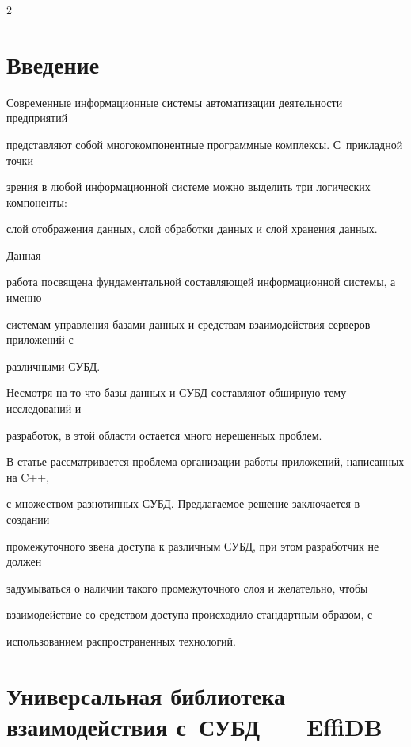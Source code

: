       \begin{multicols}{2}

      

            \label{st\stat}



\section{Введение}



Современные информационные системы автоматизации деятельности предприятий 

пред\-став\-ляют собой многокомпонентные программные комплексы. С~прикладной точки 

зрения в любой информаци\-онной системе можно выделить три логических компоненты: 

слой отображения данных, слой обработки данных и слой хранения данных. 

{



}



Данная 

работа посвящена фундаментальной со\-став\-ля\-ющей информационной системы, а именно 

сис\-те\-мам управления базами данных и средствам взаимодействия серверов приложений с 

различными СУБД.



Несмотря на то что базы данных и СУБД со\-ставля\-ют обширную тему исследований и 

разработок, в этой области остается много нерешенных проб\-лем.



В статье рассматривается проблема организации работы приложений, написанных на C++, 

с множеством разнотипных СУБД. Предлагаемое решение заключается в создании 

промежуточного звена доступа к различным СУБД, при этом разработчик не должен 

задумываться о наличии такого промежуточного слоя и желательно, чтобы 

взаимодействие со средством доступа происходило стандартным образом, с 

использованием распространенных технологий.



\section{Универсальная библиотека взаимодействия с~СУБД~--- EffiDB}




\end{multicols}
